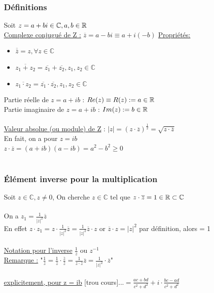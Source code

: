 \documentclass[12pt,a4paper]{article}
\begin{document}
{\subsubsection{Définitions}
Soit $z = a+bi \in \mathbb{C}, a,b \in \mathbb{R}$\\
\underline{Complexe conjugué de Z :} $\overline{z} = a-bi \equiv a +i (-b)$
\underline{Propriétés:} \begin{itemize}
\item $\overline{\overline{z}} = z, \forall z \in \mathbb{C}$
\item $\overline{z_1 + z_2} = \overline{z_1} + \overline{z_2}, z_1, z_2 \in \mathbb{C}$
\item $\overline{z_1 \cdot z_2} = \overline{z_1} \cdot \overline{z_2}, z_1, z_2 \in \mathbb{C}$
\end{itemize}
Partie réelle de $z = a+ib$ : $Re(z) \equiv R(z) := a \in \mathbb{R}$\\
Partie imaginaire de $z = a+ ib$ : $Im(z) := b \in \mathbb{R}$\\
\\
\underline{Valeur absolue (ou module) de Z} : $|z| = (z \cdot \overline{z})^{\frac{1}{2}} = \sqrt{z \cdot \overline{z}}$\\
En fait, on a pour $z = ib$\\
$z \cdot \overline{z}= (a+ib)(a-ib) = a^2 - b^2 \geq 0$\\
\\
\begin{center}
\end{center}
\subsubsection{Élément inverse pour la multiplication}
Soit $z \in \mathbb{C}, z \neq 0$, On cherche $z \in \mathbb{C}$ tel que $z \cdot \overline{z} = 1 \in \mathbb{R} \subset \mathbb{C}$\\
\\
On a $z_1 = \frac{1}{|z|^2}\overline{z}$\\
En effet $z \cdot z_1 = z \cdot \frac{1}{|z|^2}\overline{z} = \frac{1}{|z|^2} \overline{z}\cdot z$ or $\overline{z} \cdot z = |z|^2$ par définition, alors = 1\\
\\
\underline{Notation pour l'inverse} $\frac{1}{z}$ ou $z^{-1}$\\
\underline{Remarque :} "$\frac{1}{z} = \frac{1}{z} \cdot \frac{\overline{z}}{\overline{z}} = \frac{1}{z \cdot \overline{z}}\overline{z} = \frac{1}{|z|^2} \cdot \overline{z}$"\\
\\
\underline{explicitement, pour z = ib}
[trou cours]...$=\frac{ac+bd}{c^2+d^2} + i\cdot\frac{bc-ad}{c^2+d^2}$
}
\end{document}
